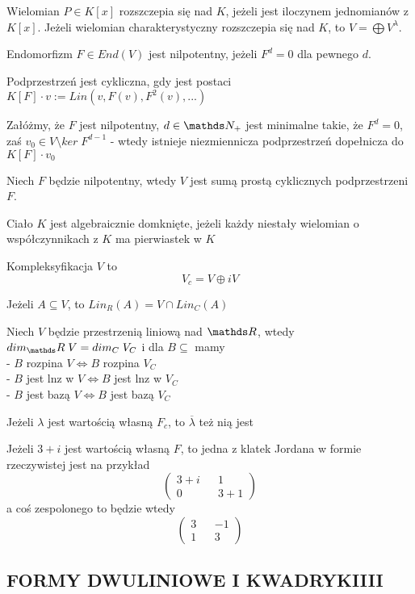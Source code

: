 \documentclass{article}
\begin{document}
\begin{multicols*}{2}
    Wielomian $P\in K[x]$ rozszczepia się nad $K$, jeżeli jest iloczynem jednomianów z $K[x]$. Jeżeli {\color{acc}wielomian charakterystyczny rozszczepia się nad $K$}, to $V=\bigoplus V^\lambda$.\bigskip

    Endomorfizm $F\in End(V)$ jest {\color{def}nilpotentny}, jeżeli $F^d=0$ dla pewnego $d$.

    {\color{def}Podprzestrzeń jest cykliczna}, gdy jest postaci $K[F]\cdot v:= Lin (v, F(v), F^2(v), ...)$\bigskip

    Załóżmy, że $F$ jest nilpotentny, $d\in \N_+$ jest minimalne takie, że $F^d=0$, zaś $v_0\in V\setminus ker\;F^{d-1}$ - wtedy istnieje niezmiennicza podprzestrzeń dopełnicza do $K[F]\cdot v_0$\bigskip

    Niech $F$ będzie nilpotentny, wtedy $V$ jest sumą prostą cyklicznych podprzestrzeni $F$.


    {\color{def}Ciało $K$ jest algebraicznie domknięte}, jeżeli każdy niestały wielomian o współczynnikach z $K$ ma pierwiastek w $K$\bigskip

    {\color{def}Kompleksyfikacja $V$} to
    $$V_c=V\oplus iV$$

    Jeżeli $A\subseteq V$, to $Lin_R(A)=V\cap Lin_C(A)$\bigskip

    Niech $V$ będzie przestrzenią liniową nad $\R$, wtedy $dim_\R\; V=dim_C\;V_C$ i dla $B\subseteq $ mamy\smallskip\\
    \indent - $B$ rozpina $V\iff B$ rozpina $V_C$\\
    \indent - $B$ jest lnz w $V\iff B$ jest lnz w $V_C$\\
    \indent - $B$ jest bazą $V\iff B$ jest bazą $V_C$\bigskip

    Jeżeli $\lambda$ jest wartością własną $F_c$, to $\overline\lambda$ też nią jest\bigskip

    Jeżeli $3+i$ jest wartością własną $F$, to jedna z klatek Jordana w formie rzeczywistej jest na przykład
    $$\begin{pmatrix}3+i && 1\\0 && 3+1\end{pmatrix}$$
    a coś zespolonego to będzie wtedy
    $$\begin{pmatrix}3 && -1\\1 && 3\end{pmatrix}$$

    \subsection*{FORMY DWULINIOWE I KWADRYKIIII}


\end{multicols*}
\end{document}
